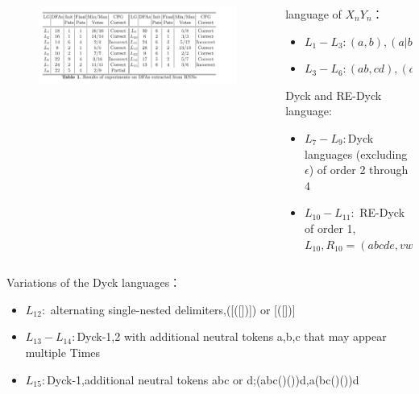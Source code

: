\documentclass[aspectratio=169%
,serif,mathserif]{beamer}
\begin{document}
\begin{frame}
	\begin{columns}
		\begin{column}{.5\textwidth}
			\begin{figure}
				\includegraphics[width=1\linewidth]{7.png}
			\end{figure}
		\end{column}
		\begin{column}{.5\textwidth}
			language of $X_nY_n$：
			\begin{itemize}
				\item $L_1-L_3:(a,b),(a|b,c|d),(ab|cd,ef|gh)$
				\item $L_3-L_6:(ab,cd),(abc,def),(ab|c,de|f)$
			\end{itemize}

			Dyck and RE-Dyck language:
			\begin{itemize}
				\item $L_7-L_9:$Dyck languages (excluding $\epsilon$) of order 2 through 4
				\item $L_{10}-L_{11}:$ RE-Dyck of order 1,$L_{10},R_{10} = (abcde,vwxyz),L_{11},R_{11} = (ab|c,de|f)$
			\end{itemize}
		\end{column}
	\end{columns}
\end{frame}

\begin{frame}
	Variations of the Dyck languages：
		\begin{itemize}
			\item $L_{12}:$ alternating single-nested delimiters,([([])]) or [([])]
			\item $L_{13}-L_{14}:$Dyck-1,2 with additional neutral tokens a,b,c that may appear multiple Times
			\item $L_{15}:$Dyck-1,additional neutral tokens abc or d;(abc()())d,a(bc()())d
		\end{itemize}
\end{frame}
\end{document}
